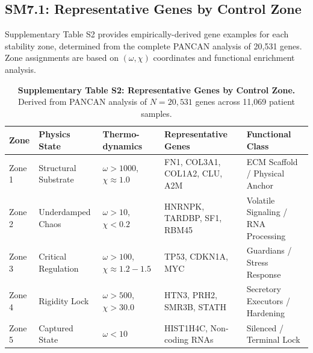 \documentclass[11pt,letterpaper]{article}
\begin{document}
\subsection{SM7.1: Representative Genes by Control Zone}

Supplementary Table S2 provides empirically-derived gene examples for each stability zone, determined from the complete PANCAN analysis of 20,531 genes. Zone assignments are based on $(\omega, \chi)$ coordinates and functional enrichment analysis.

\begin{table}[h!]
\centering
\caption{\textbf{Supplementary Table S2: Representative Genes by Control Zone.} Derived from PANCAN analysis of $N=20,531$ genes across 11,069 patient samples.}
\begin{tabular}{lp{3.5cm}p{2.5cm}p{4cm}p{3.5cm}}
\toprule
\textbf{Zone} & \textbf{Physics State} & \textbf{Thermo-dynamics} & \textbf{Representative Genes} & \textbf{Functional Class} \\
\midrule
Zone 1 & Structural Substrate & $\omega > 1000$, $\chi \approx 1.0$ & FN1, COL3A1, COL1A2, CLU, A2M & ECM Scaffold / Physical Anchor \\
\midrule
Zone 2 & Underdamped Chaos & $\omega > 10$, $\chi < 0.2$ & HNRNPK, TARDBP, SF1, RBM45 & Volatile Signaling / RNA Processing \\
\midrule
Zone 3 & Critical Regulation & $\omega > 100$, $\chi \approx 1.2-1.5$ & TP53, CDKN1A, MYC & Guardians / Stress Response \\
\midrule
Zone 4 & Rigidity Lock & $\omega > 500$, $\chi > 30.0$ & HTN3, PRH2, SMR3B, STATH & Secretory Executors / Hardening \\
\midrule
Zone 5 & Captured State & $\omega < 10$ & HIST1H4C, Non-coding RNAs & Silenced / Terminal Lock \\
\bottomrule
\end{tabular}
\end{table}
\end{document}
